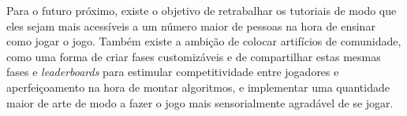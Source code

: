 \documentclass[conference]{IEEEtran}
\begin{document}
Para o futuro próximo, existe o objetivo de retrabalhar os tutoriais de modo que eles sejam mais acessíveis a um número maior de pessoas na hora de ensinar como jogar o jogo. Também existe a ambição de colocar artifícios de comunidade, como uma forma de criar fases customizáveis e de compartilhar estas mesmas fases e \textit{leaderboards} para estimular competitividade entre jogadores e aperfeiçoamento na hora de montar algoritmos, e implementar uma quantidade maior de arte de modo a fazer o jogo mais sensorialmente agradável de se jogar.


%
\end{document}
